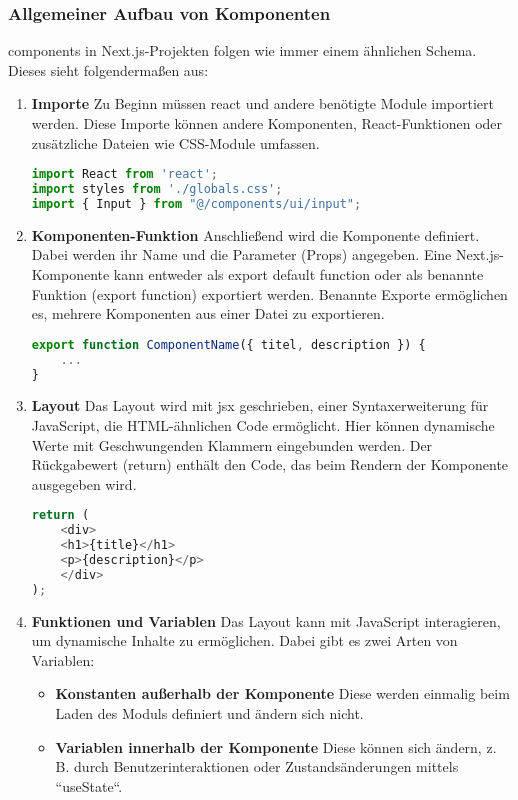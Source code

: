 \subsubsection{Allgemeiner Aufbau von Komponenten}
\gls{components} in Next.js-Projekten folgen wie immer einem ähnlichen Schema. Dieses sieht folgendermaßen aus:

\begin{enumerate}
	
	\item \textbf{Importe} Zu Beginn müssen \gls{react} und andere benötigte Module importiert werden. Diese Importe können andere Komponenten, React-Funktionen oder zusätzliche Dateien wie CSS-Module umfassen.
\begin{lstlisting}[language=JavaScript]
import React from 'react';
import styles from './globals.css'; 
import { Input } from "@/components/ui/input";
	\end{lstlisting}
	
	\item \textbf{Komponenten-Funktion} Anschließend wird die Komponente definiert. Dabei werden ihr Name und die Parameter (Props) angegeben. Eine Next.js-Komponente kann entweder als export default function oder als benannte Funktion (export function) exportiert werden. Benannte Exporte ermöglichen es, mehrere Komponenten aus einer Datei zu exportieren.
\begin{lstlisting}[language=JavaScript]
export function ComponentName({ titel, description }) {
    ...
}
	\end{lstlisting}

\newpage

    
	\item \textbf{Layout} Das Layout wird mit \gls{jsx} geschrieben, einer Syntaxerweiterung für JavaScript, die HTML-ähnlichen Code ermöglicht. Hier können dynamische Werte mit Geschwungenden Klammern eingebunden werden. Der Rückgabewert (return) enthält den Code, das beim Rendern der Komponente ausgegeben wird.
\begin{lstlisting}[language=JavaScript]
return (
    <div>
    <h1>{title}</h1>
    <p>{description}</p>
    </div>
);
	\end{lstlisting}
	
	\item \textbf{Funktionen und Variablen} Das Layout kann mit JavaScript interagieren, um dynamische Inhalte zu ermöglichen. Dabei gibt es zwei Arten von Variablen:
	\begin{itemize}
		\item \textbf{Konstanten außerhalb der Komponente} Diese werden einmalig beim Laden des Moduls definiert und ändern sich nicht.
		\item \textbf{Variablen innerhalb der Komponente} Diese können sich ändern, z. B. durch Benutzerinteraktionen oder Zustandsänderungen mittels ``useState``.\cite{prompt25_pollak}
	\end{itemize}
\end{enumerate}

